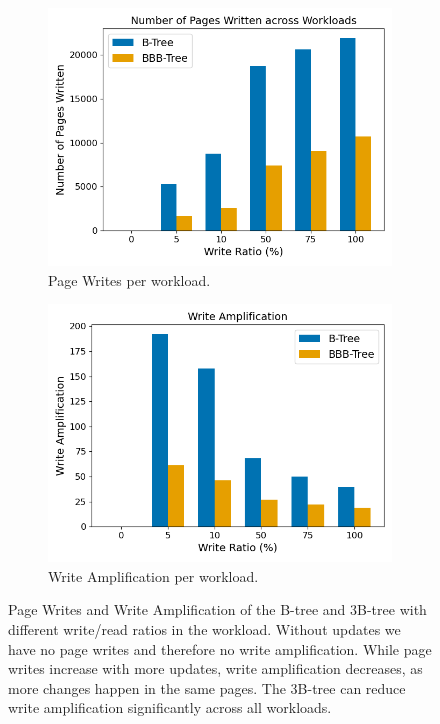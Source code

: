 \begin{figure}[htpb]
  \centering
  \begin{subfigure}[t]{0.49\textwidth}
    \centering
    \includegraphics[width=\textwidth]{figures/evaluation/pageviews_write_ratios.png}
    \caption{Page Writes per workload.}
    \label{fig:write-ratios-page-writes}
  \end{subfigure}
  \hfill
  \begin{subfigure}[t]{0.49\textwidth}
    \centering
    \includegraphics[width=\textwidth]{figures/evaluation/pageviews_write_ratios_wa.png}
    \caption{Write Amplification per workload.}
    \label{fig:write-ratios-wa}
  \end{subfigure}
  \caption{Page Writes and Write Amplification of the B-tree and 3B-tree with different write/read ratios in the workload. Without updates we have no page writes and therefore no write amplification. While page writes increase with more updates, write amplification decreases, as more changes happen in the same pages. The 3B-tree can reduce write amplification significantly across all workloads.}  
  \label{fig:write-ratios}
\end{figure}

